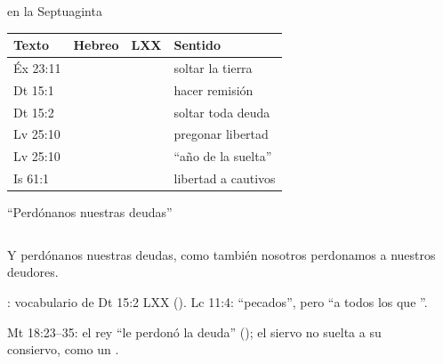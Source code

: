 \begin{frame}{ en la Septuaginta}
\scriptsize\renewcommand{\arraystretch}{1.18}
\begin{tabular}{@{}L{1.8cm}L{3.3cm}L{4.0cm}L{2.8cm}@{}}
\toprule
\textbf{Texto} & \textbf{Hebreo} & \textbf{LXX} & \textbf{Sentido} \\ \midrule
Éx 23:11 &  &  & soltar la tierra \\
Dt 15:1 &  &  & hacer remisión \\
Dt 15:2 &  &  & soltar toda deuda \\
Lv 25:10 &  &  & pregonar libertad \\
Lv 25:10 &  &  & ``año de la suelta'' \\
Is 61:1 &  &  & libertad a cautivos \\
\bottomrule
\end{tabular}\par\medskip
{}
\end{frame}

\begin{frame}{``Perdónanos nuestras deudas''}
\begin{columns}[c,onlytextwidth]
\begin{column}{0.57\textwidth}
\begin{cita}Y perdónanos nuestras deudas, como también nosotros perdonamos a nuestros deudores.\end{cita}
\scriptsize {}: vocabulario de Dt 15:2 LXX (). Lc 11:4: ``pecados'', pero ``a todos los que ''.\par\smallskip
Mt 18:23--35: el rey ``le perdonó la deuda'' (); el siervo no suelta a su consiervo, como un .
\end{column}
\begin{column}{0.41\textwidth}\end{column}
\end{columns}
\end{frame}

